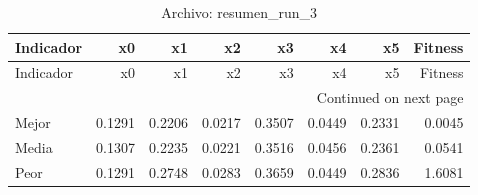 \begin{longtable}{lrrrrrrr}
\caption{Archivo: resumen\_run\_3}\label{tab:resumen_run_3} \\
\toprule
Indicador & x0 & x1 & x2 & x3 & x4 & x5 & Fitness \\
\midrule
\endfirsthead
\toprule
Indicador & x0 & x1 & x2 & x3 & x4 & x5 & Fitness \\
\midrule
\endhead
\midrule
\multicolumn{8}{r}{Continued on next page} \\
\midrule
\endfoot
\bottomrule
\endlastfoot
Mejor & 0.1291 & 0.2206 & 0.0217 & 0.3507 & 0.0449 & 0.2331 & 0.0045 \\
Media & 0.1307 & 0.2235 & 0.0221 & 0.3516 & 0.0456 & 0.2361 & 0.0541 \\
Peor & 0.1291 & 0.2748 & 0.0283 & 0.3659 & 0.0449 & 0.2836 & 1.6081 \\
\end{longtable}